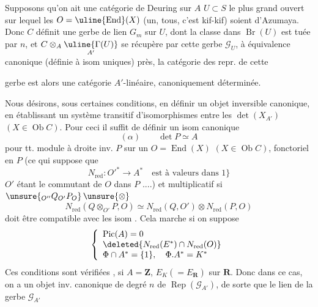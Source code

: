 
Supposons qu'on ait une catégorie de Deuring  sur $A$  
$U\subset S$ le plus grand ouvert sur lequel les $O=\uline{\operatorname{End}}(X)$ (un, tous, c'est kif-kif) soient d'Azumaya. Donc $C$ définit une gerbe  de lien $G_m$ sur $U$, dont la classe dans $\operatorname{Br}(U)$ est tuée par $n$,  et $C\otimes_A\underset{A'}{\uline{\Gamma(U)}}$ se récupère par cette gerbe $\mathcal G_U$, à équivalence canonique (définie à isom uniques) près,  la catégorie des repr. de cette


 gerbe est alors une catégorie $A'$-linéaire, canoniquement déterminée.


Nous désirons, sous certaines conditions, en définir un objet inversible canonique, en établissant un système transitif d'isomorphismes entre les $\det(X_{A'})$ $(X\in\operatorname{Ob}C)$. Pour ceci il suffit de définir un isom canonique
\[
(\alpha)\qquad \det P\simeq A
\]
pour tt. module à droite inv. $P$ sur un $O=\operatorname{End}(X)$ $(X\in\operatorname{Ob}C)$, fonctoriel en $P$ (ce qui suppose que
\[
N_{\mathrm{red}}:O'^*\longrightarrow A^*\quad\text{est à valeurs dans }1\}
\]
$O'$ étant le commutant de $O$ dans $P$ ....) et multiplicatif si $\unsure{{}_{O''}Q_{O'}P_O}\,\unsure{\otimes}$
\[
N_{\mathrm{red}}(Q\otimes_{O'}P,O)\simeq N_{\mathrm{red}}(Q,O')\otimes N_{\mathrm{red}}(P,O)
\]
doit être compatible avec les isom . Cela marche si on suppose
\margin{[posant $\Phi=N_{\mathrm{red}}(E^*)\subset K^*$, où $O=\operatorname{End}(X)$, $E=O\otimes_A K$]}
\[
\left\{\begin{array}{l}
\operatorname{Pic}(A)=0\\
\deleted{N_{\mathrm{red}}(E^*)\cap N_{\mathrm{red}}(O)}\\
\Phi\cap A^*=\{1\},\quad \Phi.A^*=K^*
\end{array}\right.
\]
Ces conditions sont vérifiées  , si $A=\mathbf Z$, $E_K(=E_{\mathbf R})$  sur $\mathbf R$. Donc dans ce cas, on a un objet inv. canonique de degré $n$ de $\operatorname{Rep}(\mathcal G_{A'})$, de sorte que le lien  de la gerbe $\mathcal G_{A'}$

